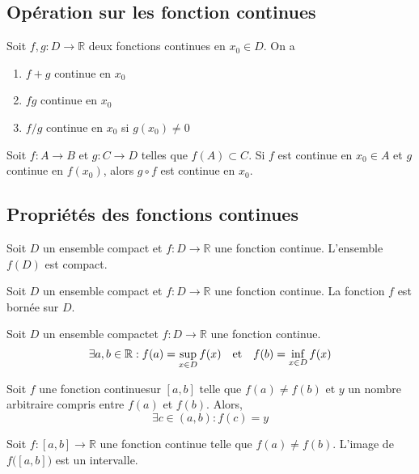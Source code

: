 		\subsection{Opération sur les fonction continues}
			\begin{mythm}
				Soit $f,g:D\longrightarrow\mathbb{R}$ deux fonctions continues en $x_0\in D$. On a 
				\begin{enumerate}[label=\alph*)]
					\item $f+g$ continue en $x_0$
					\item $fg$  continue en $x_0$
					\item $f/g$  continue en $x_0$ si $g(x_0)\neq 0$
				\end{enumerate}
			\end{mythm}
			\begin{mythm}
				Soit $f:A\longrightarrow B$ et $g:C\longrightarrow D$ telles que $f(A)\subset C$. Si $f$ est continue en $x_0\in A$ et $g$ continue en $f(x_0)$, alors $g\circ f$ est continue en $x_0$.
			\end{mythm}
		\subsection{Propriétés des fonctions continues}
		\begin{mythm}
			Soit $D$ un ensemble compact et $f:D \longrightarrow\mathbb{R}$ une fonction continue. L'ensemble $f(D)$ est compact.
		\begin{mythm}[Corollaire]
			Soit $D$ un ensemble compact et $f:D \longrightarrow\mathbb{R}$ une fonction continue. La fonction $f$ est bornée sur $D$.
		\end{mythm}
		\end{mythm}
		\begin{mythm}\index{Bornes atteintes}
			Soit $D$ un ensemble compactet $f:D \longrightarrow\mathbb{R}$ une fonction continue. \[\exists a,b\in\mathbb{R} : f(a)=\sup\limits_{x\in D}f(x)\quad\text{et}\quad f(b)=\inf\limits_{x\in D}f(x)\]
		\end{mythm}
		\begin{mythm}
			Soit $f$ une fonction continuesur $[a,b]$ telle que $f(a)\neq f(b)$ et $y$ un nombre arbitraire compris entre $f(a)$ et $f(b)$. Alors,\[\exists c\in (a,b) : f(c)=y\]
		\begin{mythm}[Corollaire]
			Soit $f:[a,b]\longrightarrow\mathbb{R}$ une fonction continue telle que $f(a)\neq f(b)$. L'image de $f\big([a,b]\big)$ est un intervalle.
		\end{mythm}
		\end{mythm}
